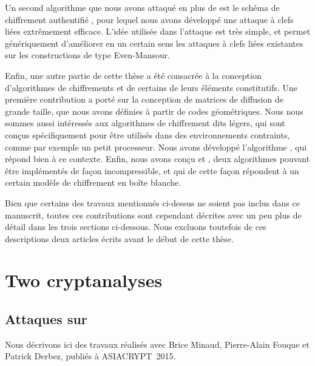 Un second algorithme que nous avons attaqué en plus de \shaone est le schéma de chiffrement authentifié \proestotr, pour lequel nous avons développé une attaque à clefs liées
extrêmement efficace. L'idée utilisée dans l'attaque est très simple, et permet génériquement d'améliorer en un certain sens les attaques à clefs liées existantes sur les constructions
de type Even-Mansour.

\medskip

Enfin, une autre partie de cette thèse a été consacrée à la conception d'algorithmes de chiffrements et de certains de leurs éléments constitutifs.
Une première contribution a porté sur la conception de matrices de diffusion de grande taille, que nous avons définies à partir de codes géométriques.
Nous nous sommes aussi intéressés aux algorithmes de chiffrement dits légers, qui sont conçus spécifiquement pour être utilisés dans des environnements
contraints, comme par exemple un petit processeur. Nous avons développé l'algorithme \fly, qui répond bien à ce contexte.
Enfin, nous avons conçu \pc et \cdb, deux algorithmes pouvant être implémentés de façon incompressible, et qui de cette façon répondent à un certain modèle
de chiffrement en boîte blanche.

\bigskip

Bien que certains des travaux mentionnés ci-dessus ne soient pas inclus dans ce manuscrit, toutes ces contributions sont cependant
décrites avec un peu plus de détail dans les trois sections ci-dessous. Nous excluons toutefois de ces descriptions deux articles écrits avant le début de cette thèse.

\section[Deux cryptanalyses]{Two cryptanalyses}

\subsection{Attaques sur \asasa \cite{DBLP:conf/asiacrypt/MinaudDFK15}}
Nous décrivons ici des travaux réalisés avec Brice Minaud, Pierre-Alain Fouque et Patrick Derbez, publiés à ASIACRYPT~2015.

\medskip

